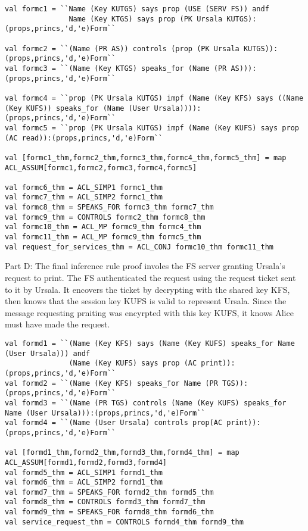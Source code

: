 \documentclass[11pt, twoside]{article}
\begin{document}
\HOLexamFourTheoremsrequestXXforXXservicesXXthm

\begin{lstlisting}
val formc1 = ``Name (Key KUTGS) says prop (USE (SERV FS)) andf
               Name (Key KTGS) says prop (PK Ursala KUTGS):(props,princs,'d,'e)Form``

val formc2 = ``(Name (PR AS)) controls (prop (PK Ursala KUTGS)):(props,princs,'d,'e)Form``
val formc3 = ``(Name (Key KTGS) speaks_for (Name (PR AS))):(props,princs,'d,'e)Form``

val formc4 = ``prop (PK Ursala KUTGS) impf (Name (Key KFS) says ((Name (Key KUFS)) speaks_for (Name (User Ursala)))):(props,princs,'d,'e)Form``
val formc5 = ``prop (PK Ursala KUTGS) impf (Name (Key KUFS) says prop (AC read)):(props,princs,'d,'e)Form``

val [formc1_thm,formc2_thm,formc3_thm,formc4_thm,formc5_thm] = map ACL_ASSUM[formc1,formc2,formc3,formc4,formc5]

val formc6_thm = ACL_SIMP1 formc1_thm
val formc7_thm = ACL_SIMP2 formc1_thm
val formc8_thm = SPEAKS_FOR formc3_thm formc7_thm
val formc9_thm = CONTROLS formc2_thm formc8_thm
val formc10_thm = ACL_MP formc9_thm formc4_thm
val formc11_thm = ACL_MP formc9_thm formc5_thm
val request_for_services_thm = ACL_CONJ formc10_thm formc11_thm
\end{lstlisting}

\newpage

Part D: The final inference rule proof involes the FS server granting Ursala's request to print. 
The FS authenticated the request using the request ticket sent to it by Ursala. It encovers the ticket 
by decrypting with the shared key KFS, then knows that the session key KUFS is valid to represent Ursala.
Since the message requesting prniting was encyrpted with this key KUFS, it knows Alice must have made the request.

\HOLexamFourTheoremsserviceXXrequestXXthm

\begin{lstlisting}
val formd1 = ``(Name (Key KFS) says (Name (Key KUFS) speaks_for Name (User Ursala))) andf
		   	   (Name (Key KUFS) says prop (AC print)):(props,princs,'d,'e)Form``
val formd2 = ``(Name (Key KFS) speaks_for Name (PR TGS)):(props,princs,'d,'e)Form``
val formd3 = ``(Name (PR TGS) controls (Name (Key KUFS) speaks_for Name (User Ursala))):(props,princs,'d,'e)Form``
val formd4 = ``(Name (User Ursala) controls prop(AC print)):(props,princs,'d,'e)Form``

val [formd1_thm,formd2_thm,formd3_thm,formd4_thm] = map ACL_ASSUM[formd1,formd2,formd3,formd4]
val formd5_thm = ACL_SIMP1 formd1_thm
val formd6_thm = ACL_SIMP2 formd1_thm
val formd7_thm = SPEAKS_FOR formd2_thm formd5_thm
val formd8_thm = CONTROLS formd3_thm formd7_thm
val formd9_thm = SPEAKS_FOR formd8_thm formd6_thm
val service_request_thm = CONTROLS formd4_thm formd9_thm
\end{lstlisting}
\end{document}
